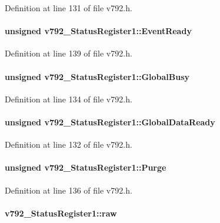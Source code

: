 Definition at line 131 of file v792.h.
\paragraph[{EventReady}]{\setlength{\rightskip}{0pt plus 5cm}unsigned {\bf v792\_\-StatusRegister1::EventReady}}\hfill\label{unionv792__StatusRegister1_aa514cfa77b6da00d529e232e5cb0f1d5}


Definition at line 139 of file v792.h.
\paragraph[{GlobalBusy}]{\setlength{\rightskip}{0pt plus 5cm}unsigned {\bf v792\_\-StatusRegister1::GlobalBusy}}\hfill\label{unionv792__StatusRegister1_aa3b5dac6c73a644ac1fd47a4e0866238}


Definition at line 134 of file v792.h.
\paragraph[{GlobalDataReady}]{\setlength{\rightskip}{0pt plus 5cm}unsigned {\bf v792\_\-StatusRegister1::GlobalDataReady}}\hfill\label{unionv792__StatusRegister1_a228e5e815796f3125f34aae7908aed3f}


Definition at line 132 of file v792.h.
\paragraph[{Purge}]{\setlength{\rightskip}{0pt plus 5cm}unsigned {\bf v792\_\-StatusRegister1::Purge}}\hfill\label{unionv792__StatusRegister1_a752f1f8f20a75719c26ddee3f90b92a5}


Definition at line 136 of file v792.h.
\paragraph[{raw}]{ {\bf v792\_\-StatusRegister1::raw}}\hfill\label{unionv792__StatusRegister1_a9b42ba98d17c9cfb80f0f493f8db5049}


